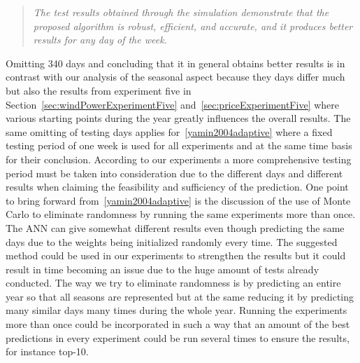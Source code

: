 \begin{quotation}
\textit{The test results obtained through the simulation demonstrate that the proposed algorithm is robust, efficient, and accurate, and it produces better results for any day of the week.}
\end{quotation}

Omitting 340 days and concluding that it in general obtains better results is in contrast with our analysis of the seasonal aspect because they days differ much but also the results from experiment five in Section~\ref{sec:windPowerExperimentFive} and~\ref{sec:priceExperimentFive} where various starting points during the year greatly influences the overall results. The same omitting of testing days applies for~\ref{yamin2004adaptive} where a fixed testing period of one week is used for all experiments and at the same time basis for their conclusion. According to our experiments a more comprehensive testing period must be taken into consideration due to the different days and different results when claiming the feasibility and sufficiency of the prediction. One point to bring forward from~\ref{yamin2004adaptive} is the discussion of the use of Monte Carlo to eliminate randomness by running the same experiments more than once. The ANN can give somewhat different results even though predicting the same days due to the weights being initialized randomly every time. The suggested method could be used in our experiments to strengthen the results but it could result in time becoming an issue due to the huge amount of tests already conducted. The way we try to eliminate randomness is by predicting an entire year so that all seasons are represented but at the same reducing it by predicting many similar days many times during the whole year. Running the experiments more than once could be incorporated in such a way that an amount of the best predictions in every experiment could be run several times to ensure the results, for instance top-10.
